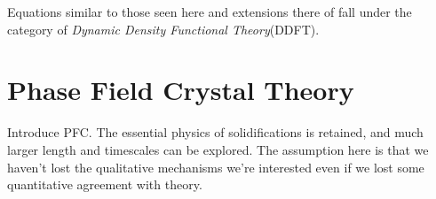 Equations similar to those seen here and extensions there of fall under the
category of \textit{Dynamic Density Functional Theory}(DDFT).  

\section{Phase Field Crystal Theory} %

{\color{ForestGreen} {\bfseries


    Introduce PFC. The essential physics of solidifications is retained,
    and much larger length and timescales can be explored. The assumption
    here is that we haven't lost the qualitative mechanisms we're
    interested even if we lost some quantitative agreement with theory.
            
} }

